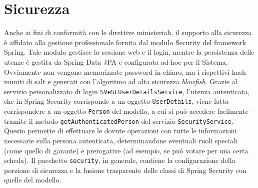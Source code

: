 \section{Sicurezza}\label{security}
Anche ai fini di conformità con le direttive ministeriali, il supporto alla sicurezza è affidato alla gestione professionale fornita dal modulo Security del framework Spring. Tale modulo gestisce la sessione web e il login, mentre la persistenza delle utenze è gestita da Spring Data JPA e configurata ad-hoc per il Sistema. Ovviamente non vengono memorizzate password in chiaro, ma i rispettivi hash muniti di salt e generati con l'algoritmo ad alta sicurezza \emph{blowfish}. Grazie al servizio personalizzato di login \verb!SVeSEUserDetailsService!, l'utenza autenticata, che in Spring Security corrisponde a un oggetto \verb!UserDetails!, viene fatta corrispondere a un oggetto \verb!Person! del modello, a cui si può accedere facilmente tramite il metodo \verb!getAuthenticatedPerson! del servizio \verb!SecurityService!. Questo permette di effettuare le dovute operazioni con tutte le informazioni necessarie sulla persona autenticata, determinandone eventuali ruoli speciali (come quello di garante) e prerogative (ad esempio, se può votare per una certa scheda). Il pacchetto \verb!security!, in generale, contiene la configurazione della porzione di sicurezza e la fusione trasparente delle classi di Spring Security con quelle del modello.
